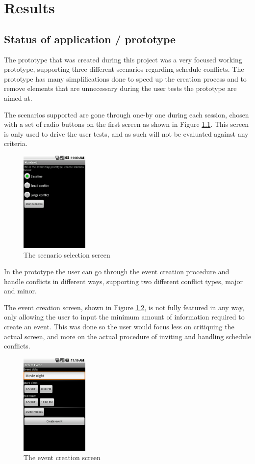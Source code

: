 \documentclass[a4paper,11pt]{report}
\begin{document}
\chapter{Results}

\section{Status of application / prototype}

The prototype that was created during this project was a very focused working
prototype, supporting three different scenarios regarding schedule
conflicts. The prototype has many simplifications done to speed up the creation
process and to remove elements that are unnecessary during the user tests the
prototype are aimed at.

The scenarios supported are gone through one-by one during each session, chosen
with a set of radio buttons on the first screen as shown in Figure
\ref{fig:scenario}. This screen is only used to drive the user tests, and as
such will not be evaluated against any criteria.

\begin{figure}[htb]
  \centering
  \includegraphics[height=50mm]{scenario}
  \caption{The scenario selection screen}
  \label{fig:scenario}
\end{figure}

In the prototype the user can go through the event creation procedure and handle
conflicts in different ways, supporting two different conflict types, major and
minor.

The event creation screen, shown in Figure \ref{fig:creation}, is not fully
featured in any way, only allowing the user to input the minimum amount of
information required to create an event. This was done so the user would focus
less on critiquing the actual screen, and more on the actual procedure of
inviting and handling schedule conflicts.

\begin{figure}[htb]
  \centering
  \includegraphics[height=50mm]{eventcreation}
  \caption{The event creation screen}
  \label{fig:creation}
\end{figure}
\end{document}
